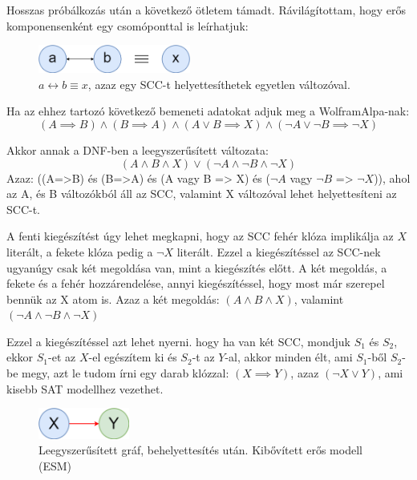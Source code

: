 \documentclass[
]{thesis-ekf}
\theoremstyle{definition}
\theoremstyle{remark}
\begin{document}
	Hosszas próbálkozás után a következő ötletem támadt. Rávilágítottam, hogy erős komponensenként egy csomóponttal is leírhatjuk:
	
	\begin{figure}[ht]
		\centering
		\includegraphics[width=5cm]{images/sajat_pelda}
		\caption{$ a\leftrightarrow b\equiv x$, azaz egy \textsc{SCC}-t helyettesíthetek egyetlen változóval.}
		\label{abra-sajatpelda-ab-x}
	\end{figure}
	
	Ha az ehhez tartozó következő bemeneti adatokat adjuk meg a WolframAlpa-nak:
	\[ (A\implies B)\wedge(B\implies A)\wedge(A\vee B \implies X)\wedge(\neg A\vee\neg B\implies\neg X) \]

	Akkor annak a \textsc{DNF}-ben a leegyszerűsített változata:
	\[ (A\wedge B\wedge X)\vee(\neg A\wedge\neg B\wedge\neg X) \]	
	Azaz: ((A=>B) és (B=>A) és (A vagy B => X) és ($ \neg A $ vagy $ \neg B $ => $ \neg X $)), ahol az A, és B változókból áll az \textsc{SCC}, valamint X változóval lehet helyettesíteni az \textsc{SCC}-t.
	
	A fenti kiegészítést úgy lehet megkapni, hogy az \textsc{SCC} fehér klóza implikálja az $ X $ literált, a fekete klóza pedig a $ \neg X $ literált. Ezzel a kiegészítéssel az \textsc{SCC}-nek ugyanúgy csak két megoldása van, mint a kiegészítés előtt. A két megoldás, a fekete és a fehér hozzárendelése, annyi kiegészítéssel, hogy most már szerepel bennük az X atom is. Azaz a két megoldás: $ (A \wedge B \wedge X) $, valamint $ (\neg A \wedge \neg B \wedge \neg X) $
	
	Ezzel a kiegészítéssel azt lehet nyerni. hogy ha van két \textsc{SCC}, mondjuk $ S_1 $ és $ S_2 $, ekkor $ S_1 $-et az $ X $-el egészítem ki és $ S_2 $-t az $ Y $-al, akkor minden élt, ami $ S_1 $-ből $ S_2 $-be megy, azt le tudom írni egy darab klózzal: $ (X\implies Y) $, azaz $ (\neg X\vee Y) $, ami kisebb \textsc{SAT} modellhez vezethet.
	
	\begin{figure}[ht]
		\centering
		\includegraphics[width=3cm]{images/sajat_pelda_5_9_to_esm}
		\caption{Leegyszerűsített gráf, behelyettesítés után. Kibővített erős modell (\textsc{ESM})}
		\label{abra-sajatpelda-59to-esm}
	\end{figure}
\end{document}
